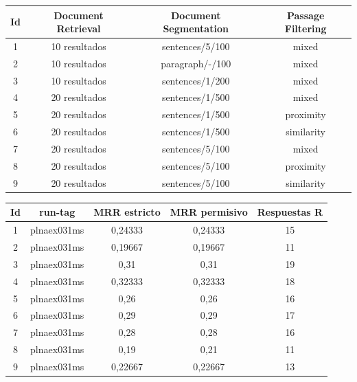 \documentclass[12pt,a4paper,titlepage]{article}
\begin{document}
\begin{table}[h!]
\begin{center}
\begin{tabular}{|c|c|c|c|}
\hline
Id & Document Retrieval & Document Segmentation & Passage Filtering\\\hline
1 & 10 resultados & sentences/5/100 & mixed\\\hline
2 & 10 resultados & paragraph/-/100 & mixed\\\hline
3 & 10 resultados & sentences/1/200 & mixed\\\hline
4 & 20 resultados & sentences/1/500 & mixed\\\hline
5 & 20 resultados & sentences/1/500 & proximity\\\hline
6 & 20 resultados & sentences/1/500 & similarity\\\hline
7 & 20 resultados & sentences/5/100 & mixed\\\hline
8 & 20 resultados & sentences/5/100 & proximity\\\hline
9 & 20 resultados & sentences/5/100 & similarity\\\hline
\end{tabular}
\end{center}
\end{table}

\begin{table}[h!]
\begin{center}
\begin{tabular}{|c|c|c|c|c|}
\hline
Id & run-tag & MRR estricto & MRR permisivo & Respuestas R\\ \hline
1 & plnaex031ms & 0,24333 & 0,24333 & 15\\ \hline
2 & plnaex031ms & 0,19667 & 0,19667 & 11\\ \hline
3 & plnaex031ms & 0,31 & 0,31 & 19\\ \hline
4 & plnaex031ms & 0,32333 & 0,32333 & 18\\ \hline
5 & plnaex031ms & 0,26 & 0,26 & 16\\ \hline
6 & plnaex031ms & 0,29 & 0,29 & 17\\ \hline
7 & plnaex031ms & 0,28 & 0,28 & 16\\ \hline
8 & plnaex031ms & 0,19 & 0,21 & 11 \\ \hline
9 & plnaex031ms & 0,22667 & 0,22667 & 13\\ \hline
\end{tabular}
\end{center}
\end{table}
\end{document}
